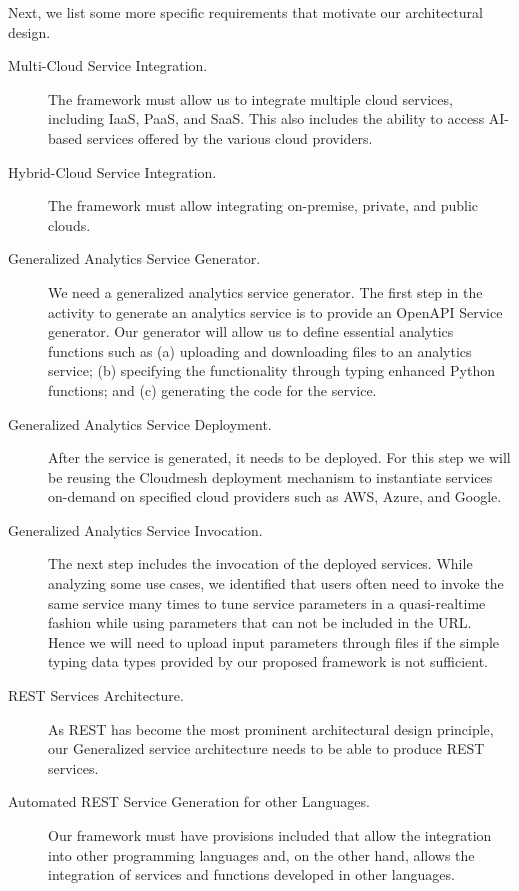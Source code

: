 Next, we list some more specific requirements that motivate our
architectural design.

\begin{description}

\item[Multi-Cloud Service Integration.] The framework must allow us to
integrate multiple cloud services, including IaaS, PaaS, and
SaaS. This also includes the ability to access AI-based services
offered by the various cloud providers. 

\item[Hybrid-Cloud Service Integration.] The framework must allow
integrating on-premise, private, and public clouds. 


\item[Generalized Analytics Service Generator.] We need a generalized
analytics service generator. The first step in the activity to
generate an analytics service is to provide an OpenAPI Service
generator. Our generator will allow us to define essential analytics
functions such as (a) uploading and downloading files to an analytics
service; (b) specifying the functionality through typing enhanced
Python functions; and (c) generating the code for the service.

\item[Generalized Analytics Service Deployment.]
After the service is generated, it needs to be deployed. For this step
we will be reusing the Cloudmesh deployment mechanism to instantiate
services on-demand on specified cloud providers such as AWS, Azure,
and Google.

\item[Generalized Analytics Service Invocation.]
The next step includes the invocation of the deployed services. While
analyzing some use cases, we identified that users often need to
invoke the same service many times to tune service parameters in a
quasi-realtime fashion while using parameters that can not be included
in the URL. Hence we will need to upload input parameters through
files if the simple typing data types provided by our proposed
framework is not sufficient.

\item[REST Services Architecture.]
As REST has become the most prominent architectural design principle,
our Generalized service architecture needs to be able to produce REST
services.

\item[Automated REST Service Generation for other Languages.] Our
framework must have provisions included that allow the integration
into other programming languages and, on the other hand, allows the
integration of services and functions developed in other languages. 
  

\end{description}
